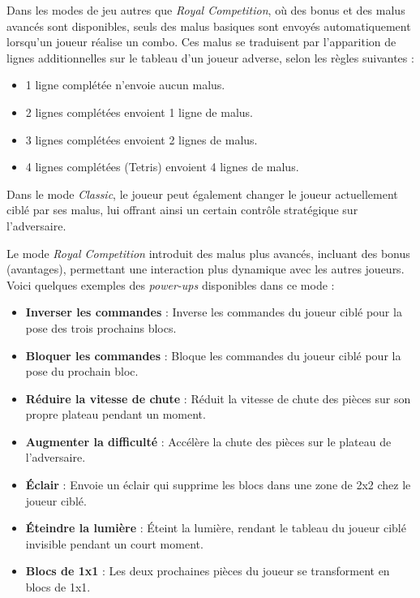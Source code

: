\documentclass{report}
\begin{document}
\noindent Dans les modes de jeu autres que \emph{Royal Competition}, où des bonus et des malus avancés sont disponibles, seuls des malus basiques sont envoyés automatiquement lorsqu'un joueur réalise un combo. Ces malus se traduisent par l'apparition de lignes additionnelles sur le tableau d'un joueur adverse, selon les règles suivantes :
\begin{itemize}
    \item 1 ligne complétée n'envoie aucun malus.
    \item 2 lignes complétées envoient 1 ligne de malus.
    \item 3 lignes complétées envoient 2 lignes de malus.
    \item 4 lignes complétées (Tetris) envoient 4 lignes de malus. \\
\end{itemize}

\vspace{-1em}

\noindent Dans le mode \emph{Classic}, le joueur peut également changer le joueur actuellement ciblé par ses malus, lui offrant ainsi un certain contrôle stratégique sur l’adversaire. \\

\vspace{-1em}

\noindent Le mode \emph{Royal Competition} introduit des malus plus avancés, incluant des bonus (avantages), permettant une interaction plus dynamique avec les autres joueurs. Voici quelques exemples des \textit{power-ups} disponibles dans ce mode :
\begin{itemize}
    \item \textbf{Inverser les commandes} : Inverse les commandes du joueur ciblé pour la pose des trois prochains blocs.
    \item \textbf{Bloquer les commandes} : Bloque les commandes du joueur ciblé pour la pose du prochain bloc.
    \item \textbf{Réduire la vitesse de chute} : Réduit la vitesse de chute des pièces sur son propre plateau pendant un moment.
    \item \textbf{Augmenter la difficulté} : Accélère la chute des pièces sur le plateau de l’adversaire.
    \item \textbf{Éclair} : Envoie un éclair qui supprime les blocs dans une zone de 2x2 chez le joueur ciblé.
    \item \textbf{Éteindre la lumière} : Éteint la lumière, rendant le tableau du joueur ciblé invisible pendant un court moment.
    \item \textbf{Blocs de 1x1} : Les deux prochaines pièces du joueur se transforment en blocs de 1x1.
\end{itemize}
\end{document}
